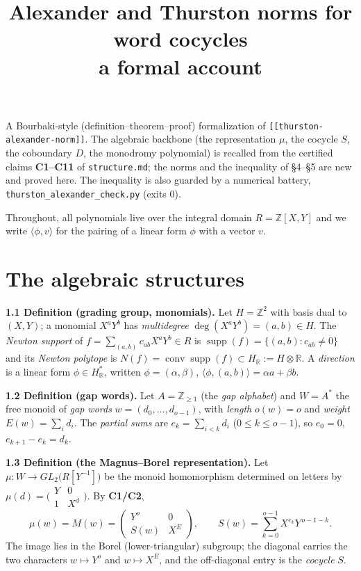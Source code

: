 \documentclass[11pt]{article}
\title{Alexander and Thurston norms for word cocycles\\ \large a formal account}
\author{}
\date{}
\begin{document}
\maketitle

A Bourbaki-style (definition--theorem--proof) formalization of
\texttt{[[thurston-alexander-norm]]}. The algebraic backbone (the representation
$\mu$, the cocycle $S$, the coboundary $D$, the monodromy polynomial) is recalled
from the certified claims \textbf{C1--C11} of \texttt{structure.md}; the norms and
the inequality of \S4--\S5 are new and proved here. The inequality is also guarded by
a numerical battery, \texttt{thurston\_alexander\_check.py} (exits 0).

Throughout, all polynomials live over the integral domain $R=\mathbb Z[X,Y]$ and we
write $\langle\phi,v\rangle$ for the pairing of a linear form $\phi$ with a vector $v$.

\hrulefill

\section{The algebraic structures}

\textbf{1.1 Definition (grading group, monomials).} Let $H=\mathbb Z^2$ with basis
dual to $(X,Y)$; a monomial $X^aY^b$ has \emph{multidegree} $\deg(X^aY^b)=(a,b)\in H$.
The \emph{Newton support} of $f=\sum_{(a,b)}c_{ab}X^aY^b\in R$ is
$\operatorname{supp}(f)=\{(a,b):c_{ab}\ne0\}$ and its \emph{Newton polytope} is
$N(f)=\operatorname{conv}\operatorname{supp}(f)\subset H_{\mathbb R}:=H\otimes\mathbb R$.
A \emph{direction} is a linear form $\phi\in H_{\mathbb R}^{*}$, written
$\phi=(\alpha,\beta)$, $\langle\phi,(a,b)\rangle=\alpha a+\beta b$.

\medskip
\textbf{1.2 Definition (gap words).} Let $A=\mathbb Z_{\ge1}$ (the \emph{gap alphabet})
and $W=A^{*}$ the free monoid of \emph{gap words} $w=(d_0,\dots,d_{o-1})$, with
\emph{length} $o(w)=o$ and \emph{weight} $E(w)=\sum_id_i$. The \emph{partial sums} are
$e_k=\sum_{i<k}d_i$ ($0\le k\le o-1$), so $e_0=0$, $e_{k+1}-e_k=d_k$.

\medskip
\textbf{1.3 Definition (the Magnus--Borel representation).} Let
$\mu:W\to GL_2\big(R[Y^{-1}]\big)$ be the monoid homomorphism determined on letters by
$\mu(d)=\big(\begin{smallmatrix}Y&0\\1&X^{d}\end{smallmatrix}\big)$. By \textbf{C1/C2},
\[
\mu(w)=M(w)=\begin{pmatrix}Y^{o}&0\\ S(w)&X^{E}\end{pmatrix},\qquad
S(w)=\sum_{k=0}^{o-1}X^{e_k}Y^{\,o-1-k}.
\]
The image lies in the Borel (lower-triangular) subgroup; the diagonal carries the two
characters $w\mapsto Y^{o}$ and $w\mapsto X^{E}$, and the off-diagonal entry is the
\emph{cocycle} $S$.
\end{document}
